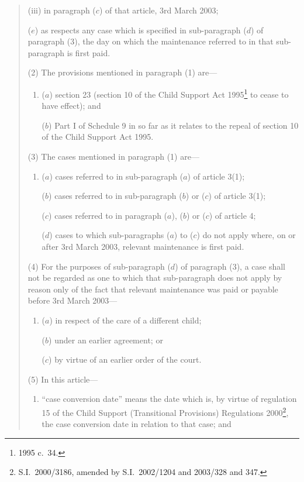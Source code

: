 \documentclass[12pt,a4paper]{article}
\begin{document}
\begin{quotation}
\begin{enumerate}
\begin{enumerate}
(iii) in paragraph ($c$)  of that article, 3rd March 2003;
\end{enumerate}

($e$) as respects any case which is specified in sub-paragraph ($d$)  of paragraph (3), the day on which the maintenance referred to in that sub-paragraph is first paid.
\end{enumerate}

(2) The provisions mentioned in paragraph (1) are—
\begin{enumerate}\item[]
($a$) section 23 (section 10 of the Child Support Act 1995\footnote{1995 c.\ 34.} to cease to have effect); and

($b$) Part I of Schedule 9 in so far as it relates to the repeal of section 10 of the Child Support Act 1995.
\end{enumerate}

(3) The cases mentioned in paragraph (1) are—
\begin{enumerate}\item[]
($a$) cases referred to in sub-paragraph ($a$)  of article 3(1);

($b$) cases referred to in sub-paragraph ($b$)  or ($c$)  of article 3(1);

($c$) cases referred to in paragraph ($a$), ($b$)  or ($c$)  of article 4;

($d$) cases to which sub-paragraphs ($a$)  to ($c$)  do not apply where, on or after 3rd March 2003, relevant maintenance is first paid.
\end{enumerate}

(4) For the purposes of sub-paragraph ($d$)  of paragraph (3), a case shall not be regarded as one to which that sub-paragraph does not apply by reason only of the fact that relevant maintenance was paid or payable before 3rd March 2003—
\begin{enumerate}\item[]
($a$) in respect of the care of a different child;

($b$) under an earlier agreement; or

($c$) by virtue of an earlier order of the court.
\end{enumerate}

(5) In this article—
\begin{enumerate}\item[]
“case conversion date” means the date which is, by virtue of regulation 15 of the Child Support (Transitional Provisions) Regulations 2000\footnote{S.I.\ 2000/3186, amended by S.I.\ 2002/1204 and 2003/328 and 347.}, the case conversion date in relation to that case; and


\end{enumerate}
\end{quotation}
\end{document}
